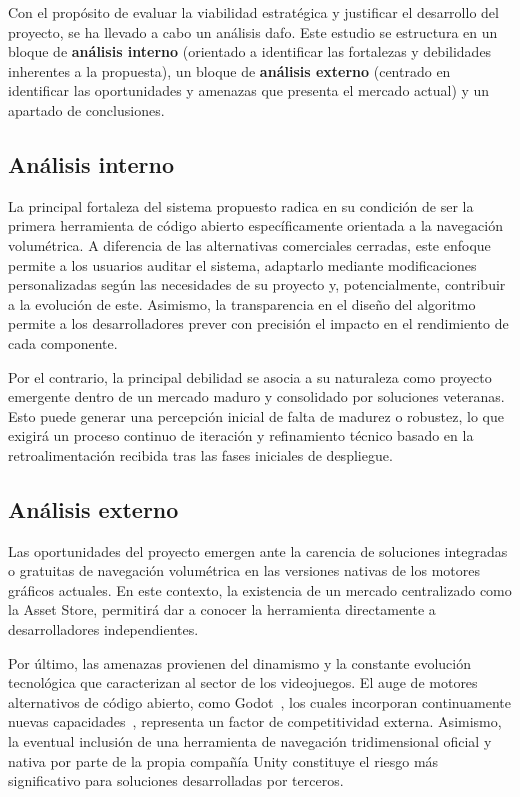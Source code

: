 Con el propósito de evaluar la viabilidad estratégica y justificar el desarrollo del proyecto, se ha llevado a cabo un análisis \acrshort{dafo}.
Este estudio se estructura en un bloque de \textbf{análisis interno} (orientado a identificar las fortalezas y debilidades inherentes a la propuesta), un bloque de \textbf{análisis externo} (centrado en identificar las oportunidades y amenazas que presenta el mercado actual) y un apartado de conclusiones.

\subsection{Análisis interno}

La principal fortaleza del sistema propuesto radica en su condición de ser la primera herramienta de código abierto específicamente orientada a la navegación volumétrica.
A diferencia de las alternativas comerciales cerradas, este enfoque permite a los usuarios auditar el sistema, adaptarlo mediante modificaciones personalizadas según las necesidades de su proyecto y, potencialmente, contribuir a la evolución de este.
Asimismo, la transparencia en el diseño del algoritmo permite a los desarrolladores prever con precisión el impacto en el rendimiento de cada componente.

Por el contrario, la principal debilidad se asocia a su naturaleza como proyecto emergente dentro de un mercado maduro y consolidado por soluciones veteranas.
Esto puede generar una percepción inicial de falta de madurez o robustez, lo que exigirá un proceso continuo de iteración y refinamiento técnico basado en la retroalimentación recibida tras las fases iniciales de despliegue.

\subsection{Análisis externo}

Las oportunidades del proyecto emergen ante la carencia de soluciones integradas o gratuitas de navegación volumétrica en las versiones nativas de los motores gráficos actuales.
En este contexto, la existencia de un mercado centralizado como la Asset Store, permitirá dar a conocer la herramienta directamente a desarrolladores independientes.

Por último, las amenazas provienen del dinamismo y la constante evolución tecnológica que caracterizan al sector de los videojuegos.
El auge de motores alternativos de código abierto, como Godot~\cite{godot}, los cuales incorporan continuamente nuevas capacidades~\cite{salmela2022game}, representa un factor de competitividad externa.
Asimismo, la eventual inclusión de una herramienta de navegación tridimensional oficial y nativa por parte de la propia compañía Unity constituye el riesgo más significativo para soluciones desarrolladas por terceros.

